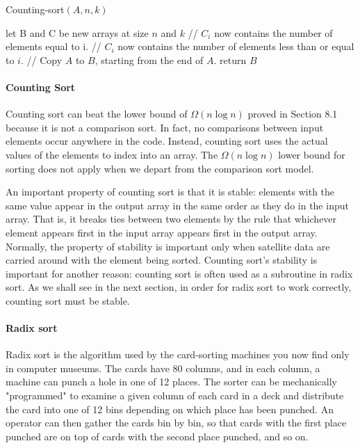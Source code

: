 \begin{algbox}{Counting-sort$(A, n, k)$}
  \begin{algorithm}[H]
  	let B and C be new arrays at size $n$ and $k$
	// $C_{i}$ now contains the number of elements equal to i.
	// $C_{i}$ now contains the number of elements less than or equal to $i$.
	// Copy $A$ to $B$, starting from the end of $A$.
	  return $B$
  \end{algorithm}
\end{algbox}

\paragraph{Counting Sort}
Counting sort can beat the lower bound of $\Omega\left(n \log n\right)$ proved in Section 8.1 because it is not a comparison sort. In fact, no comparisons between input elements occur anywhere in the code. Instead, counting sort uses the actual values of the elements to index into an array. The $\Omega\left(n \log n\right)$ lower bound for sorting does not apply when we depart from the comparison sort model.

An important property of counting sort is that it is stable: elements with the same value appear in the output array in the same order as they do in the input array. That is, it breaks ties between two elements by the rule that whichever element appears first in the input array appears first in the output array. Normally, the property of stability is important only when satellite data are carried around with the element being sorted. Counting sort's stability is important for another reason: counting sort is often used as a subroutine in radix sort. As we shall see in the next section, in order for radix sort to work correctly, counting sort must be stable.

\paragraph{Radix sort}
Radix sort is the algorithm used by the card-sorting machines you now find only in computer museums. The cards have 80 columns, and in each column, a machine can punch a hole in one of 12 places. The sorter can be mechanically "programmed" to examine a given column of each card in a deck and distribute the card into one of 12 bins depending on which place has been punched. An operator can then gather the cards bin by bin, so that cards with the first place punched are on top of cards with the second place punched, and so on.

